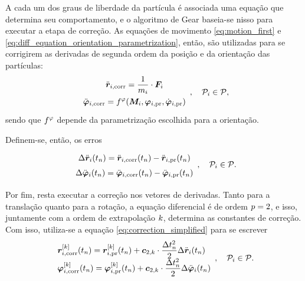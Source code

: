 A cada um dos graus de liberdade da partícula é associada uma equação que determina seu comportamento, e o algoritmo de Gear baseia-se nisso para executar a etapa de correção. As equações de movimento \eqref{eq:motion_first} e \eqref{eq:diff_equation_orientation_parametrization}, então, são utilizadas para se corrigirem as derivadas de segunda ordem da posição e da orientação das partículas:
\begin{equation*}
	\def\arraystretch{1.5}
	\begin{array}{c}
		\displaystyle \accelerationicorr =  \dfrac{1}{\massi}\cdot \forcei \\
		\displaystyle \dorientationicorr{2} = \eqFor{\orientationScalar}\pqty{\torquei, \orientationipr, \dorientationipr{1}}
	\end{array}, \quad \particlei \in \particleSet,
\end{equation*}
sendo que \(f^{\varphi}\) depende da parametrização escolhida para a orientação.

Definem-se, então, os erros
\begin{equation*}
	\def\arraystretch{1.5}
	\begin{array}{c}
		\Delta \accelerationi\pqty{\instant[n]} = \accelerationicorr\pqty{\instant[n]} - \accelerationipr\pqty{\instant[n]} \\
		\Delta \dorientationi{2}\pqty{\instant[n]} = \dorientationicorr{2}\pqty{\instant[n]} - \dorientationipr{2}\pqty{\instant[n]} \\
	\end{array}, \quad \particlei\in\particleSet.
\end{equation*}

Por fim, resta executar a correção nos vetores de derivadas. Tanto para a translação quanto para a rotação, a equação diferencial é de ordem \(p = 2\), e isso, juntamente com a ordem de extrapolação \(k\), determina as constantes de correção. Com isso, utiliza-se a equação \eqref{eq:correction_simplified} para se escrever	
\begin{equation*}
	\def\arraystretch{1.5}
	\begin{array}{l}
		\drvec{\taylorOrder}{\positionicorr}\pqty{\instant[n]} = \drvec{\taylorOrder}{\positionipr}\pqty{\instant[n]} + \correctorConstantVector{\taylorOrder}{2}\cdot\dfrac{\Dt[n]^2}{2}\Delta \accelerationi\pqty{\instant[n]} \\
		\drvec{\taylorOrder}{\orientationicorr}\pqty{\instant[n]} = \drvec{\taylorOrder}{\orientationipr}\pqty{\instant[n]} + \correctorConstantVector{\taylorOrder}{2}\cdot\dfrac{\Dt[n]^2}{2}\Delta \dorientationi{2}\pqty{\instant[n]}
	\end{array}, \quad \particlei\in\particleSet.
\end{equation*}

